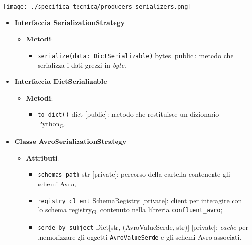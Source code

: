 \begin{center}
	\texttt{[image: ./specifica\_tecnica/producers\_serializers.png]}
\end{center}

\begin{itemize}
	\item \textbf{Interfaccia SerializationStrategy}
	      \begin{itemize}
		      \item \textbf{Metodi}:
		            \begin{itemize}
			            \item \texttt{serialize(data: DictSerializable)} bytes [public]: metodo che serializza i dati grezzi in \textit{byte}.
		            \end{itemize}
	      \end{itemize}
	\item \textbf{Interfaccia DictSerializable}
	      \begin{itemize}
		      \item \textbf{Metodi}:
		            \begin{itemize}
			            \item \texttt{to\_dict()} dict [public]: metodo che restituisce un dizionario \href{https://7last.github.io/docs/pb/documentazione-interna/glossario\#python}{Python\textsubscript{G}}.
		            \end{itemize}
	      \end{itemize}
	\item \textbf{Classe AvroSerializationStrategy}
	      \begin{itemize}
		      \item \textbf{Attributi}:
		            \begin{itemize}
			            \item \texttt{schemas\_path} str [private]: percorso della cartella contenente gli schemi Avro;
			            \item \texttt{registry\_client} SchemaRegistry [private]: client per interagire con lo \href{https://7last.github.io/docs/pb/documentazione-interna/glossario\#schema-registry}{schema registry\textsubscript{G}}, contenuto nella libreria \texttt{confluent\_avro};
			            \item \texttt{serde\_by\_subject} Dict[str, (AvroValueSerde, str)] [private]: \textit{cache} per memorizzare gli oggetti \texttt{AvroValueSerde} e gli schemi Avro associati.

\end{itemize}
\end{itemize}
\end{itemize}
